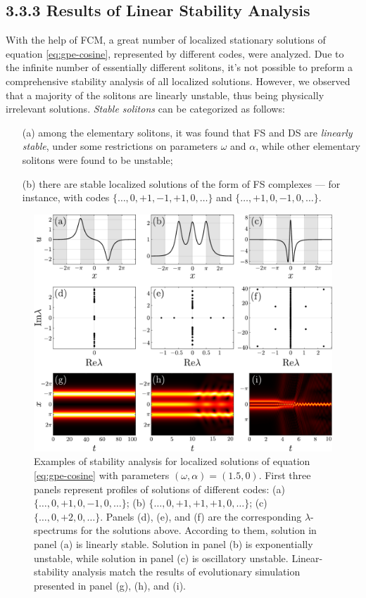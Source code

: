 \subsection*{3.3.3 Results of Linear Stability Analysis}

With the help of FCM, a great number of localized stationary solutions of equation \eqref{eq:gpe-cosine}, represented by different codes, were analyzed.
Due to the infinite number of essentially different solitons, it's not possible to preform a comprehensive stability analysis of all localized solutions.
However, we observed that a majority of the solitons are linearly unstable, thus being physically irrelevant solutions.
{\it Stable solitons} can be categorized as follows:
\begin{itemize}
	\item[(a)] among the elementary solitons, it was found that FS and DS are {\it linearly stable}, under some restrictions on parameters $\omega$ and $\alpha$, while other elementary solitons were found to be unstable;
	\item[(b)] there are stable localized solutions of the form of FS complexes --- for instance, with codes $\{ \dots, 0, +1, -1, +1, 0, \dots \}$ and $\{ \dots, +1, 0, -1, 0, \dots \}$.
\end{itemize}

\begin{figure}[h!]
\centering
	\includegraphics[scale = 1]{pic/stability demonstration for cosine equation}
	\caption{
		Examples of stability analysis for localized solutions of equation \eqref{eq:gpe-cosine} with parameters $(\omega, \alpha) = (1.5, 0)$.
		First three panels represent profiles of solutions of different codes: (a) $\{ \dots, 0, +1, 0, -1, 0, \dots \}$; (b) $\{ \dots, 0, +1, +1, +1, 0, \dots \}$; (c) $\{ \dots, 0, +2, 0, \dots \}$.
		Panels (d), (e), and (f) are the corresponding $\lambda$-spectrums for the solutions above.
		According to them, solution in panel (a) is linearly stable.
		Solution in panel (b) is exponentially unstable, while solution in panel (c) is oscillatory unstable.
		Linear-stability analysis match the results of evolutionary simulation presented in panel (g), (h), and (i).
	}
\label{fig:stability-cosine}
\end{figure}

